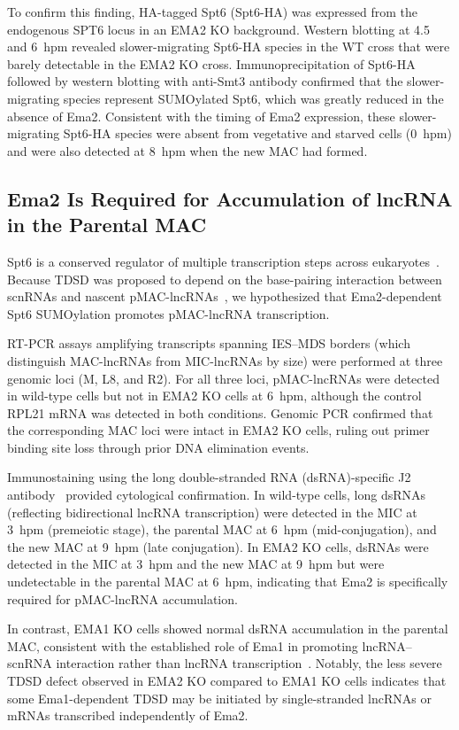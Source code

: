 \documentclass[12pt]{article}
\begin{document}
To confirm this finding, HA-tagged Spt6 (Spt6-HA) was expressed from the endogenous SPT6 locus in an EMA2 KO background.
Western blotting at 4.5 and 6~hpm revealed slower-migrating Spt6-HA species in the WT cross that were barely detectable in the EMA2 KO cross.
Immunoprecipitation of Spt6-HA followed by western blotting with anti-Smt3 antibody confirmed that the slower-migrating species represent SUMOylated Spt6, which was greatly reduced in the absence of Ema2.
Consistent with the timing of Ema2 expression, these slower-migrating Spt6-HA species were absent from vegetative and starved cells (0~hpm) and were also detected at 8~hpm when the new MAC had formed.

\subsection{Ema2 Is Required for Accumulation of lncRNA in the Parental MAC}

Spt6 is a conserved regulator of multiple transcription steps across eukaryotes~\citep{Garber2023}.
Because TDSD was proposed to depend on the base-pairing interaction between scnRNAs and nascent pMAC-lncRNAs~\citep{Aronica2008, Noto2018}, we hypothesized that Ema2-dependent Spt6 SUMOylation promotes pMAC-lncRNA transcription.

RT-PCR assays amplifying transcripts spanning IES--MDS borders (which distinguish MAC-lncRNAs from MIC-lncRNAs by size) were performed at three genomic loci (M, L8, and R2).
For all three loci, pMAC-lncRNAs were detected in wild-type cells but not in EMA2 KO cells at 6~hpm, although the control RPL21 mRNA was detected in both conditions.
Genomic PCR confirmed that the corresponding MAC loci were intact in EMA2 KO cells, ruling out primer binding site loss through prior DNA elimination events.

Immunostaining using the long double-stranded RNA (dsRNA)-specific J2 antibody~\citep{Schoenborn1991} provided cytological confirmation.
In wild-type cells, long dsRNAs (reflecting bidirectional lncRNA transcription) were detected in the MIC at 3~hpm (premeiotic stage), the parental MAC at 6~hpm (mid-conjugation), and the new MAC at 9~hpm (late conjugation).
In EMA2 KO cells, dsRNAs were detected in the MIC at 3~hpm and the new MAC at 9~hpm but were undetectable in the parental MAC at 6~hpm, indicating that Ema2 is specifically required for pMAC-lncRNA accumulation.

In contrast, EMA1 KO cells showed normal dsRNA accumulation in the parental MAC, consistent with the established role of Ema1 in promoting lncRNA--scnRNA interaction rather than lncRNA transcription~\citep{Aronica2008}.
Notably, the less severe TDSD defect observed in EMA2 KO compared to EMA1 KO cells indicates that some Ema1-dependent TDSD may be initiated by single-stranded lncRNAs or mRNAs transcribed independently of Ema2.
\end{document}
